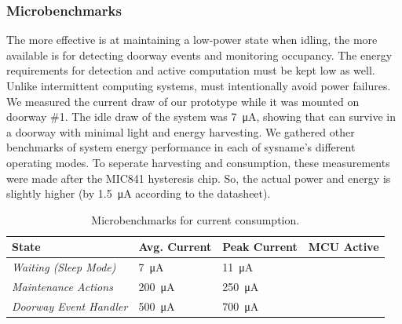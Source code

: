 \subsubsection{Microbenchmarks}
\label{sec:microbenchmarks}
The more effective \sysname is at maintaining a low-power state when idling, the more available \sysname is for detecting doorway events and monitoring occupancy.
The energy requirements for detection and active computation must be kept low as well.
Unlike intermittent computing systems, \sysname must intentionally avoid power failures.
We measured the current draw of our \sysname prototype while it was mounted on doorway \#1.
The idle draw of the system was \SI{7}{\micro\ampere}, showing that \sysname can survive in a doorway with minimal light and energy harvesting.
We gathered other benchmarks of system energy performance in each of sysname's different operating modes. To seperate harvesting and consumption, these measurements were made after the MIC841 hysteresis chip. So, the actual power and energy is slightly higher (by \SI{1.5}{\micro\ampere} according to the datasheet).


%
\begin{table}[t]
\footnotesize
\begin{tabular}{@{}p{1.4in}llc@{}}
\toprule
\textbf{State}          & \multicolumn{1}{r}{\textbf{Avg. Current}} & \multicolumn{1}{r}{\textbf{Peak Current}} & \multicolumn{1}{r}{\textbf{MCU Active}} \\ \midrule
\textit{Waiting (Sleep Mode)}       	& \SI{7}{\micro\ampere}	&  \SI{11}{\micro\ampere}	& \textcolor{magenta}{\xmark} \\
\textit{Maintenance Actions} & \SI{200}{\micro\ampere}	& \SI{250}{\micro\ampere}		 & \textcolor{green}{\cmark} \\
\textit{Doorway Event Handler} & \SI{500}{\micro\ampere}	& \SI{700}{\micro\ampere}	    & \textcolor{green}{\cmark} \\ \midrule
\end{tabular}
\caption{Microbenchmarks for \sysname current consumption.}
\label{tab:microbenchmarks}
\end{table}


